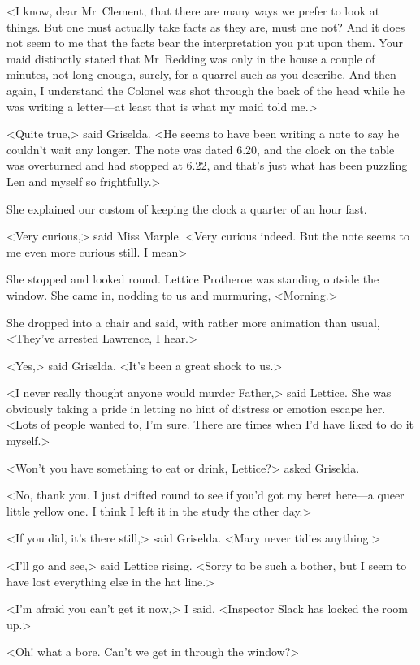 <I know, dear Mr~Clement, that there are many ways we prefer to look at things. But one must actually take facts as they are, must one not? And it does not seem to me that the facts bear the interpretation you put upon them. Your maid distinctly stated that Mr~Redding was only in the house a couple of minutes, not long enough, surely, for a quarrel such as you describe. And then again, I understand the Colonel was shot through the back of the head while he was writing a letter—at least that is what my maid told me.>

<Quite true,> said Griselda. <He seems to have been writing a note to say he couldn't wait any longer. The note was dated 6.20, and the clock on the table was overturned and had stopped at 6.22, and that's just what has been puzzling Len and myself so frightfully.>

She explained our custom of keeping the clock a quarter of an hour fast.

<Very curious,> said Miss Marple. <Very curious indeed. But the note seems to me even more curious still. I mean\longdash>

She stopped and looked round. Lettice Protheroe was standing outside the window. She came in, nodding to us and murmuring, <Morning.>

She dropped into a chair and said, with rather more animation than usual, <They've arrested Lawrence, I hear.>

<Yes,> said Griselda. <It's been a great shock to us.>

<I never really thought anyone would murder Father,> said Lettice. She was obviously taking a pride in letting no hint of distress or emotion escape her. <Lots of people wanted to, I'm sure. There are times when I'd have liked to do it myself.>

<Won't you have something to eat or drink, Lettice?> asked Griselda.

<No, thank you. I just drifted round to see if you'd got my beret here—a queer little yellow one. I think I left it in the study the other day.>

<If you did, it's there still,> said Griselda. <Mary never tidies anything.>

<I'll go and see,> said Lettice rising. <Sorry to be such a bother, but I seem to have lost everything else in the hat line.>

<I'm afraid you can't get it now,> I said. <Inspector Slack has locked the room up.>

<Oh! what a bore. Can't we get in through the window?>

